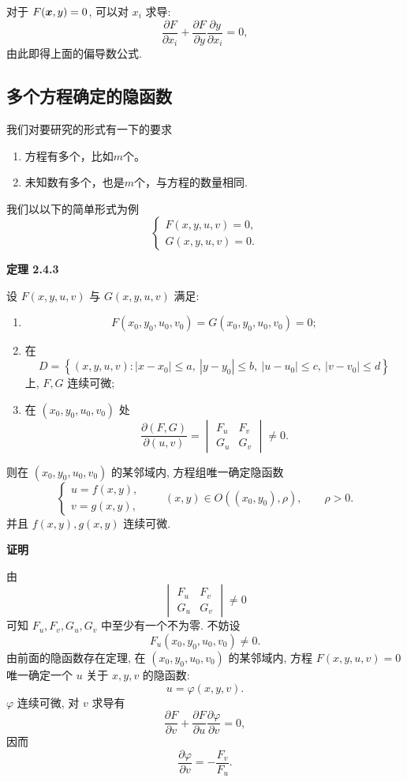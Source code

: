 对于 $F(\boldsymbol{x},y)=0$, 可以对 $x_i$ 求导:
\[
\frac{\partial F}{\partial x_i}
+
\frac{\partial F}{\partial y}
\frac{\partial y}{\partial x_i}
=0,
\]
由此即得上面的偏导数公式.



\subsection*{多个方程确定的隐函数}
我们对要研究的形式有一下的要求
\begin{enumerate}
	\item 方程有多个，比如$m$个。
	\item 未知数有多个，也是$m$个，与方程的数量相同.
\end{enumerate}
我们以以下的简单形式为例
\[
\begin{cases}
F(x,y,u,v)=0,\\
G(x,y,u,v)=0.
\end{cases}
\]



\textbf{定理 2.4.3}

设 $F(x,y,u,v)$ 与 $G(x,y,u,v)$ 满足:
	\begin{enumerate}
		\item
		\[
		F(x_0,y_0,u_0,v_0)
		=
		G(x_0,y_0,u_0,v_0)
		=0;
		\]
		\item 在
		\[
		D=
		\left\{
		(x,y,u,v):
		|x-x_0|\le a,\ |y-y_0|\le b,\
		|u-u_0|\le c,\ |v-v_0|\le d
		\right\}
		\]
		上, $F,G$ 连续可微;
		\item 在 $(x_0,y_0,u_0,v_0)$ 处
		\[
		\frac{\partial(F,G)}{\partial(u,v)}
		=
		\begin{vmatrix}
		F_u&F_v\\
		G_u&G_v
		\end{vmatrix}
		\ne0.
		\]
	\end{enumerate}
	则在 $(x_0,y_0,u_0,v_0)$ 的某邻域内, 方程组唯一确定隐函数
	\[
	\begin{cases}
	u=f(x,y),\\
	v=g(x,y),
	\end{cases}
	\qquad
	(x,y)\in O((x_0,y_0),\rho),
	\qquad \rho>0.
	\]
	并且 $f(x,y),g(x,y)$ 连续可微.






\textbf{证明}

由
	\[
	\begin{vmatrix}
	F_u&F_v\\
	G_u&G_v
	\end{vmatrix}
	\ne0
	\]
	可知 $F_u,F_v,G_u,G_v$ 中至少有一个不为零.
	不妨设
	\[
	F_u(x_0,y_0,u_0,v_0)\ne0.
	\]
	由前面的隐函数存在定理, 在
	$(x_0,y_0,u_0,v_0)$ 的某邻域内,
	方程 $F(x,y,u,v)=0$ 唯一确定一个 $u$ 关于 $x,y,v$ 的隐函数:
	\[
	u=\varphi(x,y,v).
	\]
	$\varphi$ 连续可微, 对 $v$ 求导有
	\[
	\frac{\partial F}{\partial v}
	+
	\frac{\partial F}{\partial u}
	\frac{\partial\varphi}{\partial v}
	=0,
	\]
	因而
	\[
	\frac{\partial\varphi}{\partial v}
	=
	-\frac{F_v}{F_u}.
	\]

